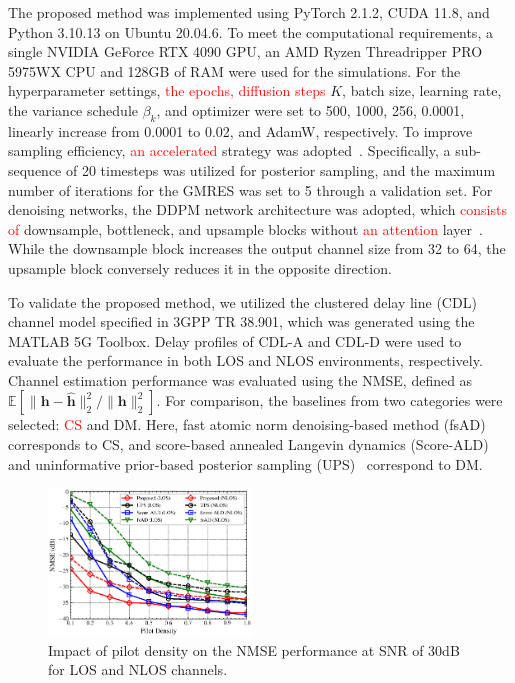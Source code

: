 \documentclass[lettersize,journal]{IEEEtran}
\newcommand{\tred}{\textcolor{red}}
\begin{document}
The proposed method was implemented using PyTorch 2.1.2, CUDA 11.8, and Python 3.10.13 on Ubuntu 20.04.6. To meet the computational requirements, a single NVIDIA GeForce RTX 4090 GPU, an AMD Ryzen Threadripper PRO 5975WX CPU and 128GB of RAM were used for the simulations. For the hyperparameter settings, \tred{the epochs, diffusion steps} $K$, batch size, learning rate, the variance schedule $\beta_{k}$, and optimizer were set to 500, 1000, 256, 0.0001, linearly increase from 0.0001 to 0.02, and AdamW, respectively.
To improve sampling efficiency, \tred{an accelerated} strategy was adopted~\cite{songDenoisingDiffusionImplicit2020}. Specifically, a sub-sequence of 20 timesteps was utilized for posterior sampling, and the maximum number of iterations for the GMRES was set to 5 through a validation set. For denoising networks, the DDPM network architecture was adopted, which \tred{consists of} downsample, bottleneck, and upsample blocks without \tred{an attention} layer~\cite{hoDenoisingDiffusionProbabilistic2020}. While the downsample block increases the output channel size from 32 to 64, the upsample block conversely reduces it in the opposite direction.

To validate the proposed method, we utilized the clustered delay line (CDL) channel model specified in 3GPP TR 38.901, which was generated using the MATLAB 5G Toolbox. Delay profiles of CDL-A and CDL-D were used to evaluate the performance in both LOS and NLOS environments, respectively. Channel estimation performance was evaluated using the NMSE, defined as $\mathbb{E}[\|\mathbf{h}-\hat{\mathbf{h}}\|_{2}^{2} / \|\mathbf{h}\|_{2}^{2}]$. For comparison, the baselines from two categories were selected: \tred{CS} and DM. Here, fast atomic norm denoising-based method (fsAD)~\cite{zhangAtomicNormDenoisingBased2018} corresponds to CS, and score-based annealed Langevin dynamics (Score-ALD)~\cite{arvinteMIMOChannelEstimation2023} and uninformative prior-based posterior sampling (UPS)~\cite{zhouGenerativeDiffusionModels2025} correspond to DM.


\begin{figure}[!t]
\includegraphics[width=0.48\textwidth]{images/20251014/fig_1.eps}
\caption{Impact of pilot density on the NMSE performance at SNR of 30dB for LOS and NLOS channels.}
\label{fig_sim_1}
\end{figure}
\end{document}
